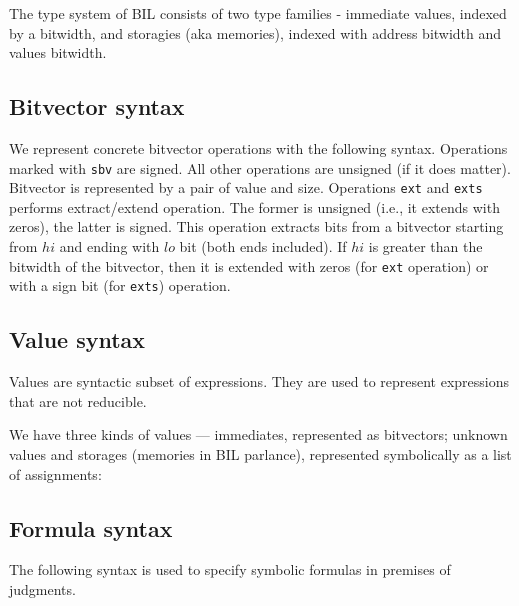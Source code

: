 \documentclass[11pt]{article}
\begin{document}
\ottgrammartabular{
\ottvar\ottinterrule
}

\ottgrammartabular{
\ottbop\ottinterrule
\ottuop\ottinterrule
\ottendian\ottinterrule
\ottcast\ottinterrule
}

The type system of BIL consists of two type families - immediate
values, indexed by a bitwidth, and storagies (aka memories), indexed
with address bitwidth and values bitwidth.

\ottgrammartabular{
\otttype\ottinterrule
}

\subsection{Bitvector syntax}
\label{sec:bitvector}

We represent concrete bitvector operations with the following syntax.
Operations marked with \verb|sbv| are signed. All other operations are
unsigned (if it does matter). Bitvector is represented by a pair of
value and size. Operations \verb|ext| and \verb|exts| performs
extract/extend operation. The former is unsigned (i.e., it extends
with zeros), the latter is signed. This operation extracts bits from a
bitvector starting from $\mathit{hi}$ and ending with $\mathit{lo}$
bit (both ends included). If $\mathit{hi}$ is greater than the
bitwidth of the bitvector, then it is extended with zeros (for
\verb|ext| operation) or with a sign bit (for \verb|exts|) operation.

\ottgrammartabular{
\ottword\ottinterrule
}

\subsection{Value syntax}
\label{sec:values}

Values are syntactic subset of expressions. They are used to represent
expressions that are not reducible.

We have three kinds of values --- immediates, represented as
bitvectors; unknown values and storages (memories in BIL parlance),
represented symbolically as a list of assignments:

\ottgrammartabular{
\ottval\ottinterrule
}


\subsection{Formula syntax}
\label{sec:formula}

The following syntax is used to specify symbolic formulas in premises
of judgments.
\end{document}
